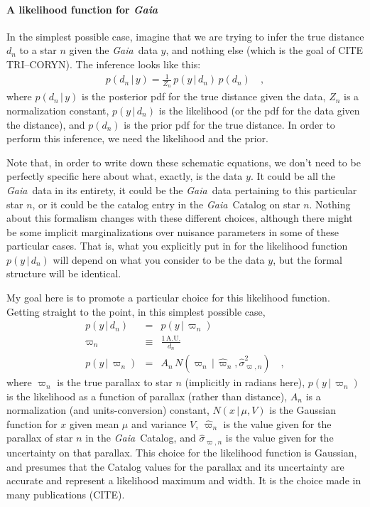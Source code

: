 \documentclass[12pt]{article}
\newcommand{\Gaia}{\textsl{Gaia}}
\newcommand{\AU}{\mathrm{A.U.}}
\newcommand{\given}{\,|\,}
\begin{document}
\paragraph{A likelihood function for \Gaia}
In the simplest possible case, imagine that we are trying to infer
the true distance $d_n$ to a star $n$ given the \Gaia\ data $y$, and nothing else
(which is the goal of CITE TRI--CORYN).
The inference looks like this:
\begin{eqnarray}
p(d_n\given y) = \frac{1}{Z_n}\,p(y\given d_n)\,p(d_n)
\quad ,
\end{eqnarray}
where
$p(d_n\given y)$ is the posterior pdf for the true distance given the data,
$Z_n$ is a normalization constant,
$p(y\given d_n)$ is the likelihood (or the pdf for the data given the distance),
and $p(d_n)$ is the prior pdf for the true distance.
In order to perform this inference, we need the likelihood and the prior.

Note that, in order to write down these schematic equations,
we don't need to be perfectly specific here about what, exactly,
is the data $y$.
It could be all the \Gaia\ data in its entirety,
it could be the \Gaia\ data pertaining to this particular star $n$,
or it could be the catalog entry in the \Gaia\ Catalog on star $n$.
Nothing about this formalism changes with these different choices,
although there might be some implicit marginalizations over nuisance
parameters in some of these particular cases.
That is, what you explicitly put in for the likelihood function $p(y\given d_n)$
will depend on what you consider to be the data $y$, but the formal structure
will be identical.

My goal here is to promote a particular choice for this likelihood function.
Getting straight to the point, in this simplest possible case, 
\begin{eqnarray}
p(y\given d_n) &=& p(y\given\varpi_n)
\\
\varpi_n &\equiv& \frac{1\,\AU}{d_n}
\\
p(y\given\varpi_n) &=& A_n\,N(\varpi_n\given\hat{\varpi}_n,\hat{\sigma}^2_{\varpi,n})
\quad ,
\end{eqnarray}
where
$\varpi_n$ is the true parallax to star $n$ (implicitly in radians here),
$p(y\given\varpi_n)$ is the likelihood as a function of parallax (rather than distance),
$A_n$ is a normalization (and units-conversion) constant,
$N(x\given\mu,V)$ is the Gaussian function for $x$ given mean $\mu$ and variance $V$,
$\hat{\varpi}_n$ is the value given for the parallax of star $n$ in the \Gaia\ Catalog,
and $\hat{\sigma}_{\varpi,n}$ is the value given for the uncertainty on that parallax.
This choice for the likelihood function is Gaussian, and presumes that the
Catalog values for the parallax and its uncertainty are accurate and represent
a likelihood maximum and width.
It is the choice made in many publications (CITE).
\end{document}
